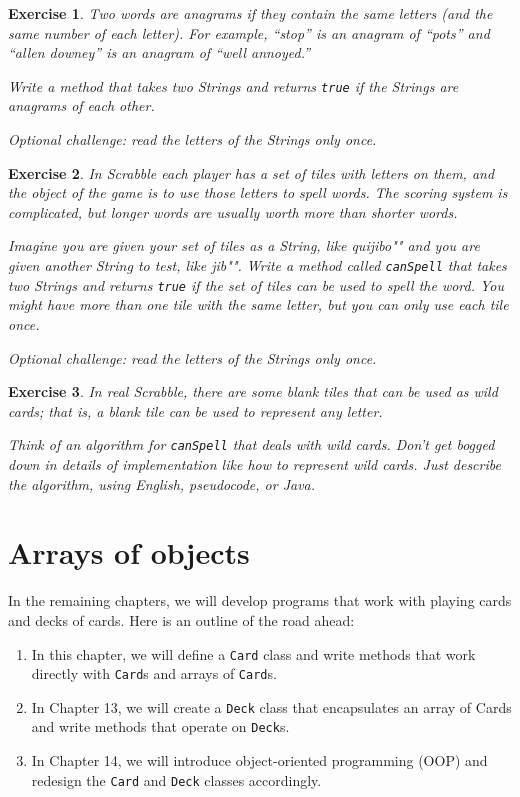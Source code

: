 \documentclass[12pt]{book}
\theoremstyle{exercise}
\newtheorem{exercise}{Exercise}[chapter]
\newcommand{\java}[1]{\verb"#1"}
\newcommand{\java}[1]{\lstinline{#1}} %
\begin{document}
\begin{exercise}
Two words are anagrams if they contain the same letters (and the same number of each letter).
For example, ``stop'' is an anagram of ``pots'' and ``allen downey'' is an anagram of ``well annoyed.''

Write a method that takes two Strings and returns \java{true} if the Strings are anagrams of each other.

Optional challenge: read the letters of the Strings only once.
\end{exercise}


\begin{exercise}
In Scrabble each player has a set of tiles with letters on them, and the object of the game is to use those letters to spell words.
The scoring system is complicated, but longer words are usually worth more than shorter words.

Imagine you are given your set of tiles as a String, like \java{"quijibo"} and you are given another String to test, like \java{"jib"}.
Write a method called \java{canSpell} that takes two Strings and returns \java{true} if the set of tiles can be used to spell the word.
You might have more than one tile with the same letter, but you can only use each tile once.

Optional challenge: read the letters of the Strings only once.
\end{exercise}


\begin{exercise}
In real Scrabble, there are some blank tiles that can be used as wild cards; that is, a blank tile can be used to represent any letter.

Think of an algorithm for \java{canSpell} that deals with wild cards.
Don't get bogged down in details of implementation like how to represent wild cards.
Just describe the algorithm, using English, pseudocode, or Java.
\end{exercise}


\chapter{Arrays of objects}

In the remaining chapters, we will develop programs that work with playing cards and decks of cards.
Here is an outline of the road ahead:

\begin{enumerate}

\item In this chapter, we will define a \java{Card} class and write methods that work directly with \java{Card}s and arrays of \java{Card}s.


\item In Chapter 13, we will create a \java{Deck} class that encapsulates an array of Cards and write methods that operate on \java{Deck}s.

\item In Chapter 14, we will introduce object-oriented programming (OOP) and redesign the \java{Card} and \java{Deck} classes accordingly.

\end{enumerate}
\end{document}
